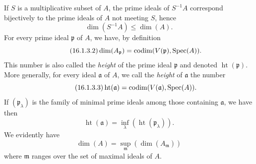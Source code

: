 \begin{env}[16.1.3]
\label{0.16.1.3}
If $S$ is a multiplicative subset of $A$, the prime ideals of $S^{-1}A$ correspond bijectively to the prime ideals of $A$ not meeting $S$, hence
\begin{equation}
\label{0.16.1.3.1}
\tag{16.1.3.1}
  \dim(S^{-1}A)\leq\dim(A).
\end{equation}
For every prime ideal $\mathfrak{p}$ of $A$, we have, by definition 
\begin{equation}
\label{0.16.1.3.2}
\tag{16.1.3.2}
  \dim(A_\mathfrak{p})=\operatorname{codim}(V(\mathfrak{p}),\operatorname{Spec}(A)).
\end{equation}
This number is also called the \emph{height} of the prime ideal $\mathfrak{p}$ and denoted $\operatorname{ht}(\mathfrak{p})$.
More generally, for every ideal $\mathfrak{a}$ of $A$, we call the \emph{height} of $\mathfrak{a}$ the number
\begin{equation}
\label{0.16.1.3.3}
\tag{16.1.3.3}
  \operatorname{ht}(\mathfrak{a})=\operatorname{codim}(V(\mathfrak{a}),\operatorname{Spec}(A)).
\end{equation}
If $(\mathfrak{p}_\lambda)$ is the family of minimal prime ideals among those containing $\mathfrak{a}$, we have then 
\begin{equation}
\label{0.16.1.3.4}
\tag{16.1.3.4}
  \operatorname{ht}(\mathfrak{a})=\inf_\lambda(\operatorname{ht}(\mathfrak{p}_\lambda)).
\end{equation}
We evidently have
\begin{equation}
\label{0.16.1.3.5}
\tag{16.1.3.5}
  \dim(A)=\sup_\mathfrak{m}(\dim(A_\mathfrak{m}))
\end{equation}
where $\mathfrak{m}$ ranges over the set of maximal ideals of $A$.
\end{env}

